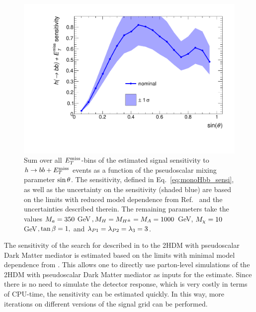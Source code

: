 \begin{figure}[tbp]
\centering
\includegraphics[width=\textwidth]{texinputs/04_grid/figures/monoHbb_sinp_scan_2_sensi_1D.pdf}
\caption[Sensitivity to $h\rightarrow bb + \MET$ signals with different $\sinp$, summed across $\MET$ bins]
{
Sum over all $\MET$-bins of the estimated signal sensitivity to $h\rightarrow bb + \MET$ events as a function of the pseudoscalar mixing parameter $\sinp$. 
The sensitivity, defined in Eq.~\ref{eq:monoHbb_sensi}, as well as the uncertainty on the sensitivity (shaded blue) 
 are based on the limits with reduced model dependence from Ref.~\cite{Aaboud:2017yqz} and the uncertainties described therein. 
The remaining parameters take the values
$ M_{a} = 350 $ GeV$, M_{H}=M_{H^{\pm}}=M_{A} = 1000$ GeV, $M_{\chi} = 10 $ GeV$, \tan\beta = 1,$ and $ \lambda_{P1} = \lambda_{P2} = \lambda_{3} = 3 $.}
\label{fig:monoHbb_sensi_full_sinp_2}
\end{figure}

The sensitivity of the search  for \monohbb described in \cite{Aaboud:2017yqz} to the 2HDM with pseudoscalar Dark Matter mediator is estimated based on the 
limits with minimal model dependence from \cite{Aaboud:2017yqz}. 
This allows one to directly use parton-level simulations of the 2HDM with pseudoscalar Dark Matter mediator as inputs for the estimate.
Since there is no need to simulate the detector response, which is very costly in terms of CPU-time, the sensitivity can be estimated quickly.
In this way,  more iterations on different versions of the signal grid can be performed.

